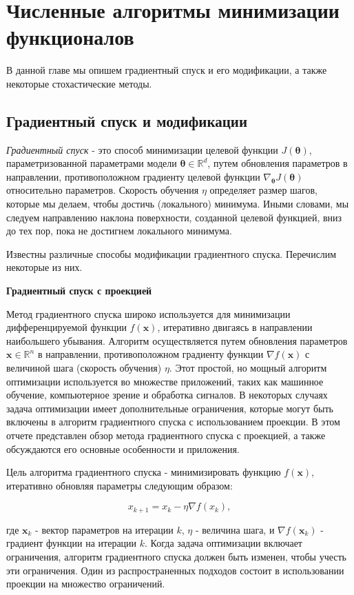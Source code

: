 \section{Численные алгоритмы минимизации функционалов}\label{sec:ch4/sec2}
В данной главе мы опишем градиентный спуск и его модификации,
а также некоторые стохастические методы.

\subsection{Градиентный спуск и модификации}
\label{subsec:ch4/sec2/grad}
\textit{Градиентный спуск} - это способ минимизации целевой функции
$J(\boldsymbol{\theta})$, параметризованной параметрами модели
$\boldsymbol{\theta} \in \mathbb{R}^{d}$, путем обновления параметров
в направлении, противоположном градиенту целевой функции
$\nabla_{\boldsymbol{\theta}} J(\boldsymbol{\theta})$
относительно параметров.
Скорость обучения $\eta$ определяет размер шагов, которые мы делаем,
чтобы достичь (локального) минимума.
Иными словами, мы следуем направлению наклона поверхности,
созданной целевой функцией, вниз до тех пор,
пока не достигнем локального минимума.

Известны различные способы модификации градиентного спуска.
Перечислим некоторые из них.

\textbf{Градиентный спуск с проекцией}

Метод градиентного спуска широко используется для минимизации дифференцируемой
функции $f(\mathbf{x})$, итеративно двигаясь в направлении наибольшего убывания.
Алгоритм осуществляется путем обновления параметров
$\mathbf{x} \in \mathbb{R}^n$ в направлении, противоположном
градиенту функции $\nabla f(\mathbf{x})$ с величиной шага
(скорость обучения) $\eta$.
Этот простой, но мощный алгоритм оптимизации используется во
множестве приложений, таких как машинное обучение, компьютерное
зрение и обработка сигналов.
В некоторых случаях задача оптимизации
имеет дополнительные ограничения, которые могут быть включены в
алгоритм градиентного спуска с использованием проекции.
В этом отчете представлен обзор метода градиентного спуска с проекцией,
а также обсуждаются его основные особенности и приложения.


Цель алгоритма градиентного спуска - минимизировать функцию
$f(\mathbf{x})$, итеративно обновляя параметры следующим образом:

\[ x_{k+1} = x_k - \eta \nabla f(x_k), \]

где $\mathbf{x}_k$ - вектор параметров на итерации $k$,
$\eta$ - величина шага, и $\nabla f(\mathbf{x}_k)$ - градиент
функции на итерации $k$.
Когда задача оптимизации включает ограничения, алгоритм
градиентного спуска должен быть изменен, чтобы учесть эти ограничения.
Один из распространенных подходов состоит в использовании проекции
на множество ограничений.


